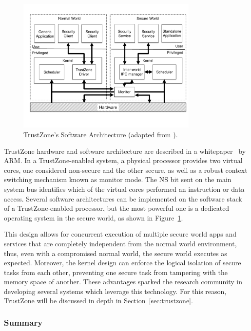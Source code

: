 \begin{figure}[t!]
	\centering
	\includegraphics[width=0.80\textwidth]{img/trustzone.pdf}
	\caption{TrustZone's Software Architecture (adapted from \cite{trustzone_whitepaper}).}
	\label{fig:trustzone_architecture}
\end{figure}

TrustZone hardware and software architecture are described in a whitepaper~\cite{trustzone_whitepaper} by ARM. In a TrustZone-enabled system, a physical processor provides two virtual cores, one considered non-secure and the other secure, as well as a robust context switching mechanism known as monitor mode. The NS bit sent on the main system bus identifies which of the virtual cores performed an instruction or data access. Several software architectures can be implemented on the software stack of a TrustZone-enabled processor, but the most powerful one is a dedicated operating system in the secure world, as shown in Figure~\ref{fig:trustzone_architecture}.

This design allows for concurrent execution of multiple secure world apps and services that are completely independent from the normal world environment, thus, even with a compromised normal world, the secure world executes as expected. Moreover, the kernel design can enforce the logical isolation of secure tasks from each other, preventing one secure task from tampering with the memory space of another. These advantages sparked the research community in developing several systems which leverage this technology. For this reason, TrustZone will be discussed in depth in Section~\ref{sec:trustzone}.

\subsubsection{Summary}

